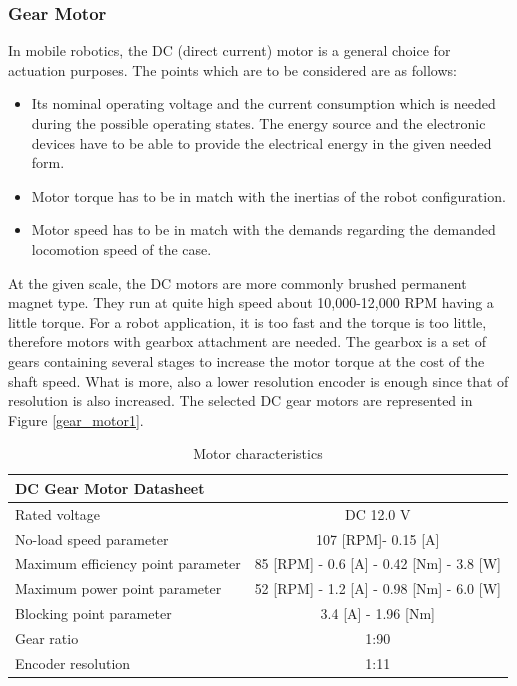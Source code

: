 \documentclass[12pt,english,twoside]{article}
\begin{document}
\subsubsection{Gear Motor}
In mobile robotics, the DC (direct current) motor is a general choice for actuation purposes. The points which are to be considered are as follows:
\begin{itemize}
	\item Its nominal operating voltage and the current consumption which is needed during the possible operating states. The energy source and the electronic devices have to be able to provide the electrical energy in the given needed form.
	\item Motor torque has to be in match with the inertias of the robot configuration.
	\item Motor speed has to be in match with the demands regarding the demanded locomotion speed of the case.
\end{itemize}
At the given scale, the DC motors are more commonly brushed permanent magnet type. They run at quite high speed about 10,000-12,000 RPM having a little torque.\cite{dc_motor_5} For a robot application, it is too fast and the torque is too little, therefore motors with gearbox attachment are needed. The gearbox is a set of gears containing several stages to increase the motor torque at the cost of the shaft speed. What is more, also a lower resolution encoder is enough since that of resolution is also increased. The selected DC gear motors are represented in Figure \ref{gear_motor1}.
\begin{table}[htb!]
	\begin{tabular}{lc}
		\hline
		\multicolumn{2}{l}{DC Gear Motor Datasheet}                                                   \\ \hline
		Rated voltage                      & DC 12.0 V                                                \\
		No-load speed parameter            & 107 {[}RPM{]}- 0.15 {[}A{]}                              \\
		Maximum efficiency point parameter & 85 {[}RPM{]} - 0.6 {[}A{]} - 0.42 {[}Nm{]} - 3.8 {[}W{]} \\
		Maximum power point parameter      & 52 {[}RPM{]} - 1.2 {[}A{]} - 0.98 {[}Nm{]} - 6.0 {[}W{]} \\
		Blocking point parameter           & 3.4 {[}A{]} - 1.96 {[}Nm{]}                              \\
		Gear ratio                         & 1:90                                                     \\
		Encoder resolution                 & 1:11                                                    
	\end{tabular}
	\label{mct}
	\caption{Motor characteristics}
\end{table}
\end{document}
